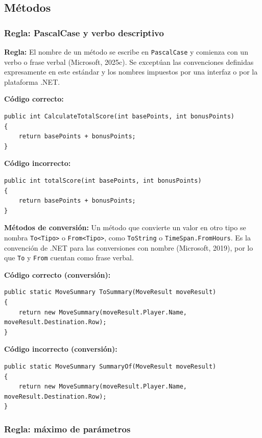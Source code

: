 \subsection{Métodos}

\subsubsection{Regla: PascalCase y verbo descriptivo}

\textbf{Regla:} El nombre de un método se escribe en \texttt{PascalCase} y comienza con un verbo o frase verbal (Microsoft, 2025c). Se exceptúan las convenciones definidas expresamente en este estándar y los nombres impuestos por una interfaz o por la plataforma .NET.

\textbf{Código correcto:}
\begin{lstlisting}[style=csharpstyle]
public int CalculateTotalScore(int basePoints, int bonusPoints)
{
    return basePoints + bonusPoints;
}
\end{lstlisting}

\textbf{Código incorrecto:}
\begin{lstlisting}[style=csharpstyle]
public int totalScore(int basePoints, int bonusPoints)
{
    return basePoints + bonusPoints;
}
\end{lstlisting}

\textbf{Métodos de conversión:} Un método que convierte un valor en otro tipo se nombra \texttt{To<Tipo>} o \texttt{From<Tipo>}, como \texttt{ToString} o \texttt{TimeSpan.FromHours}. Es la convención de .NET para las conversiones con nombre (Microsoft, 2019), por lo que \texttt{To} y \texttt{From} cuentan como frase verbal.

\textbf{Código correcto (conversión):}
\begin{lstlisting}[style=csharpstyle]
public static MoveSummary ToSummary(MoveResult moveResult)
{
    return new MoveSummary(moveResult.Player.Name, moveResult.Destination.Row);
}
\end{lstlisting}

\textbf{Código incorrecto (conversión):}
\begin{lstlisting}[style=csharpstyle]
public static MoveSummary SummaryOf(MoveResult moveResult)
{
    return new MoveSummary(moveResult.Player.Name, moveResult.Destination.Row);
}
\end{lstlisting}

\subsubsection{Regla: máximo de parámetros}

